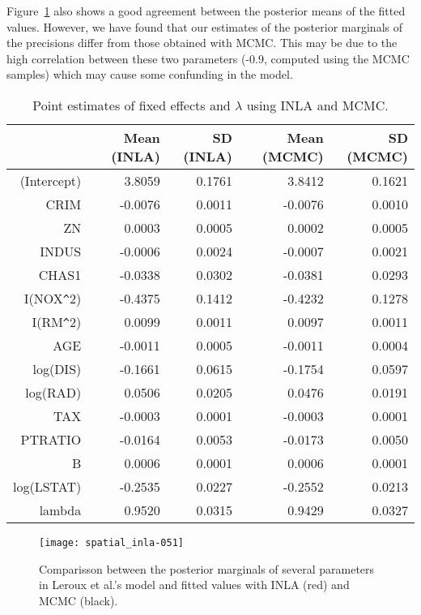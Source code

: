 \documentclass[article]{jss}
\begin{document}
Figure~\ref{fig:leroux} also shows a good agreement between the posterior
means of the fitted values. However, we have found that our estimates
of the posterior marginals of the precisions differ from those obtained
with MCMC. This may be due to the high correlation between these two parameters
(-0.9, computed using the MCMC samples) which may cause some confunding in the
model.

\begin{table}[ht]
\centering
\begin{tabular}{rrrrr}
  \hline
 & Mean (INLA) & SD (INLA) & Mean (MCMC) & SD (MCMC) \\ 
  \hline
(Intercept) & 3.8059 & 0.1761 & 3.8412 & 0.1621 \\ 
  CRIM & -0.0076 & 0.0011 & -0.0076 & 0.0010 \\ 
  ZN & 0.0003 & 0.0005 & 0.0002 & 0.0005 \\ 
  INDUS & -0.0006 & 0.0024 & -0.0007 & 0.0021 \\ 
  CHAS1 & -0.0338 & 0.0302 & -0.0381 & 0.0293 \\ 
  I(NOX\verb|^|2) & -0.4375 & 0.1412 & -0.4232 & 0.1278 \\ 
  I(RM\verb|^|2) & 0.0099 & 0.0011 & 0.0097 & 0.0011 \\ 
  AGE & -0.0011 & 0.0005 & -0.0011 & 0.0004 \\ 
  log(DIS) & -0.1661 & 0.0615 & -0.1754 & 0.0597 \\ 
  log(RAD) & 0.0506 & 0.0205 & 0.0476 & 0.0191 \\ 
  TAX & -0.0003 & 0.0001 & -0.0003 & 0.0001 \\ 
  PTRATIO & -0.0164 & 0.0053 & -0.0173 & 0.0050 \\ 
  B & 0.0006 & 0.0001 & 0.0006 & 0.0001 \\ 
  log(LSTAT) & -0.2535 & 0.0227 & -0.2552 & 0.0213 \\ 
  lambda & 0.9520 & 0.0315 & 0.9429 & 0.0327 \\ 
   \hline
\end{tabular}
\caption{Point estimates of fixed effects and $\lambda$ using INLA and MCMC.} 
\label{tab:leroux}
\end{table}

\begin{figure}[h]
\begin{center}
\texttt{[image: spatial\_inla-051]}
\end{center}
\caption{Comparisson between the posterior marginals of several parameters in 
Leroux et al.'s model and fitted values with INLA (red) and MCMC (black).}
\label{fig:leroux}
\end{figure}
\end{document}
